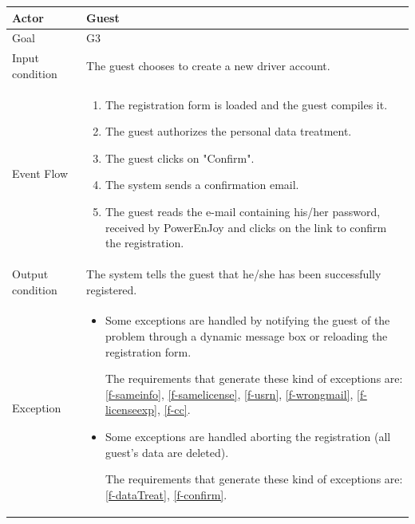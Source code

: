 \begin{table}[H]
\begin{center}
	\begin{tabular}{| l | p{} |}
		\hline
		Actor & Guest \\
		\hline
		Goal & G3
		\\
		\hline
		Input condition & The guest chooses to create a new driver account.  \\
		\hline
		Event Flow & \begin{enumerate}
			\item The registration form is loaded and the guest compiles it.
			\item The guest authorizes the personal data treatment.
			\item The guest clicks on "Confirm".
			\item The system sends a confirmation email.
			\item The guest reads the e-mail containing his/her password, received by PowerEnJoy and clicks on the link to confirm the registration.
		\end{enumerate}
		\\
		\hline
		Output condition & The system tells the guest that he/she has been successfully registered. \\
		\hline
		
		Exception &  \begin{itemize}
			\item Some exceptions are handled by notifying the guest of the problem through a dynamic message box or reloading the registration form.
			
			The requirements that generate these kind of exceptions are:
			\ref{f-sameinfo},   %
			\ref{f-samelicense}, %
			\ref{f-usrn},       %
			\ref{f-wrongmail},  %
			\ref{f-licenseexp}, %
			\ref{f-cc}.			%
			
			\item Some exceptions are handled aborting the registration (all guest's data are deleted).
			
			The requirements that generate these kind of exceptions are:
			\ref{f-dataTreat},   %
			\ref{f-confirm}.   %
		\end{itemize}
		\\
		\hline
	\end{tabular}
\end{center}
\end{table}

